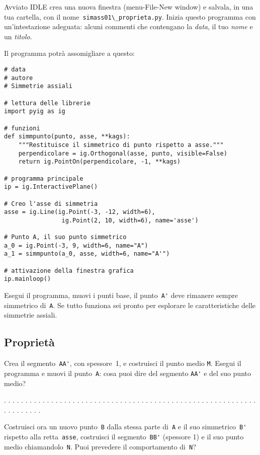 Avviato IDLE crea una nuova finestra (menu-File-New window) e salvala,
in una tua cartella, con il nome~\lstinline{simass01\_proprieta.py}.
Inizia questo programma con un'intestazione adeguata: alcuni commenti che 
contengano la \emph{data}, il tuo \emph{nome} e un \emph{titolo}.

Il programma potrà assomigliare a questo:

\begin{lstlisting}
# data
# autore
# Simmetrie assiali

# lettura delle librerie
import pyig as ig

# funzioni
def simmpunto(punto, asse, **kags):
    """Restituisce il simmetrico di punto rispetto a asse."""
    perpendicolare = ig.Orthogonal(asse, punto, visible=False)
    return ig.PointOn(perpendicolare, -1, **kags)

# programma principale
ip = ig.InteractivePlane()

# Creo l'asse di simmetria
asse = ig.Line(ig.Point(-3, -12, width=6),
                ig.Point(2, 10, width=6), name='asse')

# Punto A, il suo punto simmetrico
a_0 = ig.Point(-3, 9, width=6, name="A")
a_1 = simmpunto(a_0, asse, width=6, name="A'")

# attivazione della finestra grafica
ip.mainloop()
\end{lstlisting}

Esegui il programma, muovi i punti base, il punto~\lstinline{A'} deve rimanere
sempre simmetrico di~\lstinline{A}. Se tutto funziona sei pronto per
esplorare le caratteristiche delle simmetrie assiali.


\subsection{Proprietà}

Crea il segmento~\lstinline{AA'}, con spessore~1, e costruisci il punto medio 
\lstinline{M}.
Esegui il programma e muovi il punto~\lstinline{A}: cosa puoi dire del segmento 
\lstinline{AA'}
e del suo punto medio?

. . . . . . . . . . . . . . . . . . . . . . . . . . . . . . . . . . . . . . . .
. . . . . . . . . . . . . . . . . . . . . . . . . . . .

Costruisci ora un nuovo punto~\lstinline{B} dalla stessa parte di~\lstinline{A}
e il suo simmetrico~\lstinline{B'} rispetto alla retta~\lstinline{asse},
costruisci il segmento~\lstinline{BB'} (spessore 1) e il suo punto medio
chiamandolo~\lstinline{N}.
Puoi prevedere il comportamento di~\lstinline{N}?

